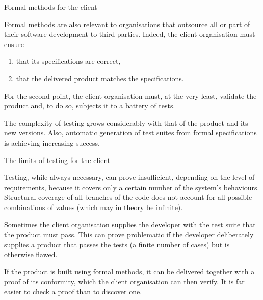 \documentclass[compress,dvipdfmx]{beamer}
\begin{document}
%
\begin{frame}{Formal methods for the client}

  Formal methods are also relevant to organisations that outsource all
  or part of their software development to third parties. Indeed, the
  client organisation must ensure
  \begin{enumerate}

    \item that its specifications are correct,

    \item that the delivered product matches the specifications.

  \end{enumerate}

  \medskip

  For the second point, the client organisation must, at the very
  least, validate the product and, to do so, subjects it to a battery
  of tests.

  \bigskip

  The complexity of testing grows considerably with that of the
  product and its new versions. Also, automatic generation of test
  suites from formal specifications is achieving increasing success.

\end{frame}

%
\begin{frame}{The limits of testing for the client}

  Testing, while always necessary, can prove insufficient,
  depending on the level of requirements, because it covers only a
  certain number of the system's behaviours. Structural coverage of
  all branches of the code does not account for all possible
  combinations of values (which may in theory be infinite).

  \bigskip

  Sometimes the client organisation supplies the developer with the
  test suite that the product must pass. This can prove problematic if
  the developer deliberately supplies a product that passes the tests
  (a finite number of cases) but is otherwise flawed.

  \bigskip

  If the product is built using formal methods, it can be delivered
  together with a proof of its conformity, which the client
  organisation can then verify. It is far easier to check a proof than
  to discover one.

\end{frame}
\end{document}
